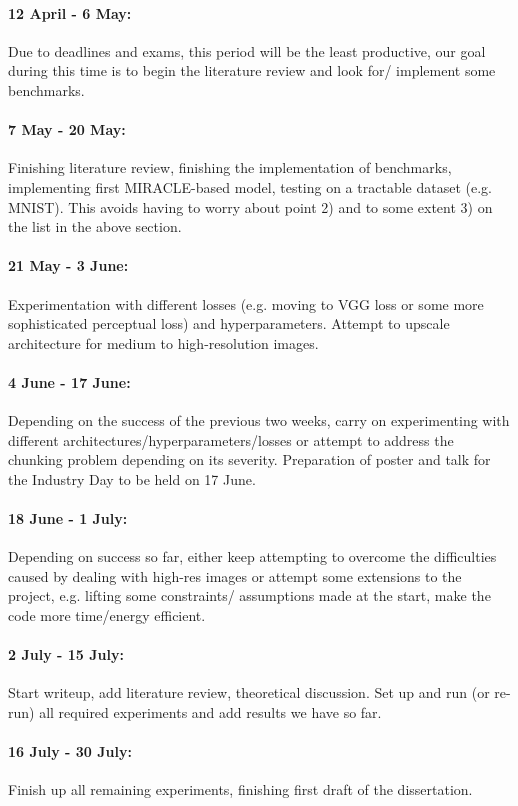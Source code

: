 \documentclass{article}
\begin{document}
\paragraph{12 April - 6 May: } Due to deadlines and exams, this period will
  be the least productive, our goal during this time is to begin the literature
  review and look for/ implement some benchmarks.
\paragraph{7 May - 20 May: } Finishing literature review, finishing
the implementation of benchmarks, implementing first MIRACLE-based model, testing on
a tractable dataset (e.g. MNIST). This avoids having to worry about point 2) and
to some extent 3) on the list in the above section.
\paragraph{21 May - 3 June: } Experimentation with different losses (e.g.
moving to VGG loss or some more sophisticated perceptual loss) and
hyperparameters. Attempt to upscale architecture for medium to high-resolution images.
\paragraph{4 June - 17 June: } Depending on the success of the previous two weeks, carry
on experimenting with different architectures/hyperparameters/losses or attempt
to address the chunking problem depending on its severity. Preparation of poster
and talk for the Industry Day to be held on 17 June.
\paragraph{18 June - 1 July: } Depending on success so far, either keep
attempting to overcome the difficulties caused by dealing with high-res images
or attempt some extensions to the project, e.g. lifting some constraints/
assumptions made at the start, make the code more time/energy efficient.
\paragraph{2 July - 15 July: } Start writeup, add literature review, theoretical
discussion. Set up and run (or re-run) all required
experiments and add results we have so far.
\paragraph{16 July - 30 July: } Finish up all remaining experiments, finishing
first draft of the dissertation.
\end{document}
